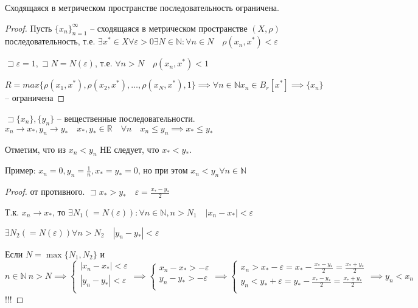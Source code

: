 \documentclass{book}
\newcommand\N{\ensuremath{\mathbb{N}}}
\newcommand\R{\ensuremath{\mathbb{R}}}
\theoremstyle{definition}
\begin{document}
    \begin{theorem}
        Сходящаяся в метрическом пространстве последовательность ограничена.
    \end{theorem}
    \begin{proof}
        Пусть $\{x_n\}_{n=1}^{\infty }$ -- сходящаяся в метрическом пространстве $(X,\rho)$ последовательность, т.е. $\exists x^*\in X\forall \varepsilon>0 \exists N\in \N :\forall n\in N \quad\rho( x_n,x^*)<\varepsilon$

        $\sqsupset \varepsilon = 1, \sqsupset N = N(\varepsilon)$, т.е. $\forall n>N\quad \rho(x_n, x^*)<1$

        $R = max\{\rho(x_1, x^*), \rho(x_2, x^*), \ldots, \rho(x_N, x^*), 1\} \implies \forall n\in \N  x_{n} \in B_r[x^*] \implies \{x_n\}$ -- ограничена
    \end{proof}

    \begin{theorem}

        $\sqsupset \{x_{n} \}, \{y_{n} \}$ -- вещественные последовательности. $x_n\to x_*, y_n\to y_*\quad x_*, y_*\in \R\quad \forall n\quad x_{n} \leqslant y_{n} \implies  x_*\leqslant y_*$

        Отметим, что из $x_{n} <y_{n} $ НЕ следует, что $x_*<y_*$.

        Пример: $x_{n} =0, y_{n}  = \frac{1}{n}, x_* = y_* =  0$, но при этом $x_n<y_n \forall n\in \N $
    \end{theorem}
    \begin{proof}
        от противного. $\sqsupset  x_*>y_*\quad \varepsilon = \frac{x_*-y_*}{2}$

        Т.к. $x_{n} \to x_*$, то $\exists N_1\left( =N(\varepsilon) \right): \forall n\in \N , n>N_1\quad \left| x_n-x_* \right| <\varepsilon $

        $\exists N_2\left( =N(\varepsilon) \right) \forall n>N_2\quad \left| y_n-y_* \right| <\varepsilon$

        Если $N = \max\{N_1, N_2\}$ и $n\in \N ~n>N \implies \begin{cases}
            \left| x_n-x_* \right| <\varepsilon\\
            \left| y_n-y_* \right| <\varepsilon\\
        \end{cases} \implies \begin{cases}
            x_n-x_* >-\varepsilon\\
            y_n-y_* >-\varepsilon\\
        \end{cases} \implies \begin{cases}
            x_n>x_*-\varepsilon = x_* - \frac{x_*-y_*}{2} = \frac{x_*+y_*}{2}\\
            y_n<y_*+\varepsilon = y_* - \frac{x_*-y_*}{2} = \frac{x_*+y_*}{2}\\
        \end{cases} \implies  y_n<x_n$ !!!
    \end{proof}
\end{document}
